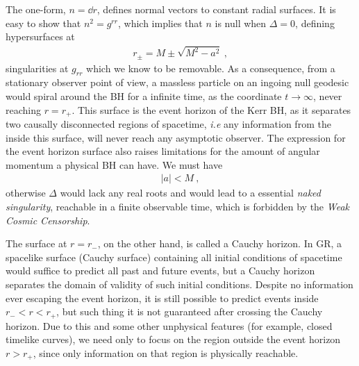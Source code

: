 The one-form, $n = \dd r$, defines normal vectors to constant radial surfaces.
It is easy to show that $n^2 = g^{rr}$, which implies that $n$ is null when $\Delta=0$, defining hypersurfaces at 
\begin{align}
    r_\pm = M \pm \sqrt{M^2 - a^2} ~,
    \label{eq2:KerrRadius}
\end{align}
singularities at $g_{rr}$ which we know to be removable.
As a consequence, from a stationary observer point of view, a massless particle on an ingoing null geodesic would spiral around the BH for a infinite time, as the coordinate $t\to\infty$, never reaching $r=r_{+}$.
This surface is the event horizon of the Kerr BH, as it separates two causally disconnected regions of spacetime, \emph{i.e} any information from the inside this surface, will never reach any asymptotic observer. 
The expression for the event horizon surface also raises limitations for the amount of angular momentum a physical BH can have.
We must have 
\begin{align}
    |a| < M ~,
    \label{eq2:spinLimit}
\end{align}
otherwise $\Delta$ would lack any real roots and would lead to a essential \emph{naked singularity}, reachable in a finite observable time, which is forbidden by the \emph{Weak Cosmic Censorship}.  

The surface at $r=r_{-}$, on the other hand, is called a Cauchy horizon.
In GR, a spacelike surface (Cauchy surface) containing all initial conditions of spacetime would suffice to predict all past and future events, but a Cauchy horizon separates the domain of validity of such initial conditions.
Despite no information ever escaping the event horizon, it is still possible to predict events inside $r_{-} < r < r_{+}$, but such thing it is not guaranteed after crossing the Cauchy horizon.
Due to this and some other unphysical features (for example, closed timelike curves), we need only to focus on the region outside the event horizon $r>r_{+}$, since only information on that region is physically reachable.

